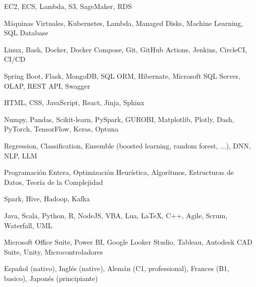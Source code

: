 

\begin{cvskills}

	{EC2, ECS, Lambda, S3, SageMaker, RDS} %

	{Máquinas Virtuales, Kubernetes, Lambda, Managed Disks, Machine Learning, SQL Database} %

	{Linux, Bash, Docker, Docker Compose, Git, GitHub Actions, Jenkins, CircleCI, CI/CD} %

	{Spring Boot, Flask, MongoDB, SQL ORM, Hibernate, Microsoft SQL Server, OLAP, REST API, Swagger} %

	{HTML, CSS, JavaScript, React, Jinja, Sphinx} %

	{Numpy, Pandas, Scikit-learn, PySpark, GUROBI, Matplotlib, Plotly, Dash, PyTorch, TensorFlow, Keras, Optuna} %

	{Regression, Classification, Ensemble (boosted learning, random forest, \(\dots\)), DNN, NLP, LLM} %

	{Programación Entera, Optimización Heurística, Algorítmos, Estructuras de Datos, Teoría de la Complejidad} %

	{Spark, Hive, Hadoop, Kafka} %

	{Java, Scala, Python, R, NodeJS, VBA, Lua, LaTeX, C++, Agile, Scrum, Waterfall, UML} %

	{Microsoft Office Suite, Power BI, Google Looker Studio, Tableau, Autodesk CAD Suite, Unity, Microcontroladores} %

	{Español (nativo), Inglés (native), Alemán (C1, professional), Frances (B1, basico), Japonés (principiante)} %

\end{cvskills}
